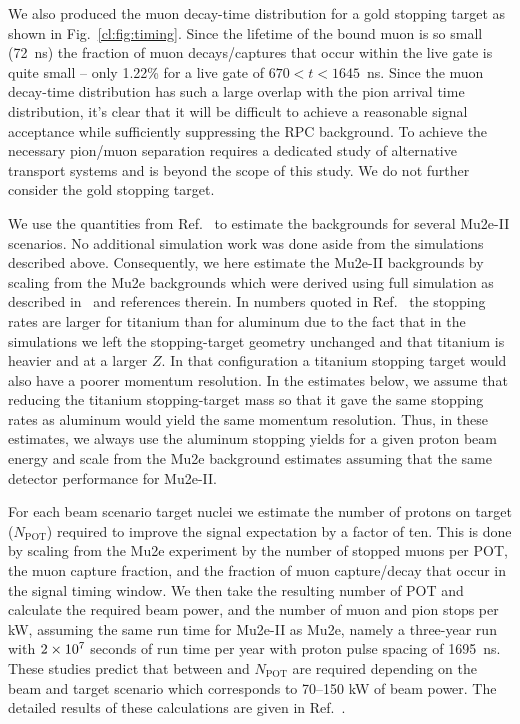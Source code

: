 We also produced the muon decay-time distribution for a gold stopping
target as shown in Fig.~\ref{cl:fig:timing}.  Since the lifetime of
the bound muon is so small (72~ns) the fraction of muon
decays/captures that occur within the live gate is quite small -- only
1.22\% for a live gate of $670 < t < 1645$~ns.  Since the muon
decay-time distribution has such a large overlap with the pion arrival
time distribution, it's clear that it will be difficult to achieve a
reasonable signal acceptance while sufficiently suppressing the RPC
background.  To achieve the necessary pion/muon separation requires a
dedicated study of alternative transport systems and is beyond the
scope of this study. We do not further consider the gold stopping
target.



%

We use the quantities from Ref.~\cite{Mu2eII} to estimate the
backgrounds for several Mu2e-II scenarios.  No additional simulation
work was done aside from the simulations described above.
Consequently, we here estimate the Mu2e-II backgrounds by scaling from
the Mu2e backgrounds which were derived using full simulation as
described in~\cite{Mu2eCDR} and references therein.  In numbers quoted
in Ref.~\cite{Mu2eII} the stopping rates are larger for titanium than
for aluminum due to the fact that in the simulations we left the
stopping-target geometry unchanged and that titanium is heavier and at
a larger $Z$.  In that configuration a titanium stopping target would
also have a poorer momentum resolution.  In the estimates below, we
assume that reducing the titanium stopping-target mass so that it gave
the same stopping rates as aluminum would yield the same momentum
resolution. Thus, in these estimates, we always use the aluminum
stopping yields for a given proton beam energy and scale from the Mu2e
background estimates assuming that the same detector performance for
Mu2e-II.


For each beam scenario target nuclei we estimate the number of protons
on target ($N_{\mathrm{POT}}$) required to improve the signal
expectation by a factor of ten. This is done by scaling from the Mu2e
experiment by the number of stopped muons per POT, the muon capture
fraction, and the fraction of muon capture/decay that occur in the
signal timing window.  We then take the resulting number of POT and
calculate the required beam power, and the number of muon and pion
stops per kW, assuming the same run time for Mu2e-II as Mu2e, namely a
three-year run with $2\times10^{7}$ seconds of run time per year with
proton pulse spacing of 1695~ns.  These studies predict that between
 and  $N_{\mathrm{POT}}$ are required
depending on the beam and target scenario which corresponds to 70--150
kW of beam power.  The detailed results of these calculations are
given in Ref.~\cite{Mu2eII}.


